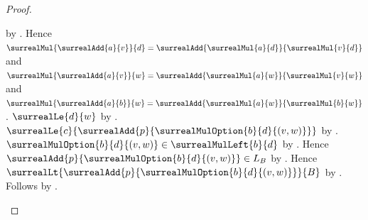 \begin{proof}
\begin{subproof}
\begin{subproof}
\begin{byCase}
\begin{byCase}
                                by \auto.
                            Hence
                                $\surrealMul{\surrealAdd{a}{v}}{d}
                                    =\surrealAdd{\surrealMul{a}{d}}
                                        {\surrealMul{v}{d}}$ and
                                $\surrealMul{\surrealAdd{a}{v}}{w}
                                    =\surrealAdd{\surrealMul{a}{w}}
                                        {\surrealMul{v}{w}}$ and
                                $\surrealMul{\surrealAdd{a}{b}}{w}
                                    =\surrealAdd{\surrealMul{a}{w}}
                                        {\surrealMul{b}{w}}$.
                            $\surrealLe{d}{w}$
                                by .
                            $\surrealLe{c}
                                {\surrealAdd{p}
                                    {\surrealMulOption{b}{d}{(v,w)}}}$
                                by
                                .
                            $\surrealMulOption{b}{d}{(v,w)}
                                \in\surrealMulLeft{b}{d}$
                                by .
                            Hence $\surrealAdd{p}
                                {\surrealMulOption{b}{d}{(v,w)}}
                                \in L_B$
                                by .
                            Hence $\surrealLt
                                {\surrealAdd{p}
                                    {\surrealMulOption{b}{d}{(v,w)}}}
                                {B}$
                                by .
                            Follows by
                                .
                    \end{byCase}
            \end{byCase}
        \end{subproof}


\end{subproof}
\end{proof}
